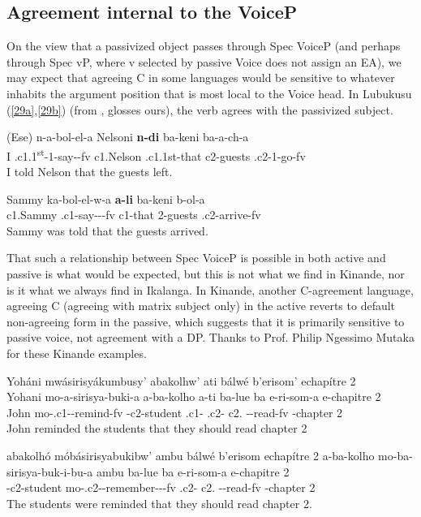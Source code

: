 \documentclass[output=paper,
modfonts
]{langscibook}
\begin{document}
\subsection{Agreement internal to the VoiceP}\label{s3.1}

On the view that a passivized object passes through Spec VoiceP (and perhaps through Spec vP, where v selected by passive Voice does not assign an EA), we may expect that agreeing C in some languages would be sensitive to whatever inhabits the argument position that is most local to the Voice head. In Lubukusu (\ref{29a},\ref{29b}) (from \citealt[368]{Diercks2013}, glosses ours), the verb agrees with the passivized subject.

\ea\label{29}
\ea \gll (Ese) n-a-bol-el-a Nelsoni \textbf{n-di} ba-keni ba-a-ch-a \label{29a}\\
          I .c1.1\textsuperscript{st}-1-say--fv c1.Nelson .c1.1st-that c2-guests
          .c2-1-go-fv\\
		\glt I told Nelson that the guests left.

\ex \gll Sammy ka-bol-el-w-a \textbf{a-li} ba-keni b-ol-a\label{29b}\\
		c1.Sammy .c1-say---fv c1-that 2-guests .c2-arrive-fv\\
	\glt  Sammy was told that the guests arrived. \z\z

That such a relationship between Spec VoiceP is possible in both active and passive is what would be expected, but this is not what we find in Kinande, nor is it what we always find in Ikalanga. In Kinande, another C-agreement language, agreeing C (agreeing with matrix subject only) in the active reverts to default non-agreeing form in the passive, which suggests that it is primarily sensitive to passive voice, not agreement with a DP. Thanks to Prof. Philip Ngessimo Mutaka for these Kinande examples.

\ea \label{30}
\ea	Yoháni mwásirisyákumbusy’ 	abakolhw’ 	ati bálwé b’erisom’  echapítre 2\\
	\gll Yohani mo-a-sirisya-buki-a  a-ba-kolho a-ti ba-lue ba
    e-ri-som-a {e-chapitre 2}\\
	John     mo-.c1--remind-fv -c2-student .c1-    .c2- c2. 		--read-fv {-chapter 2} \\
	\glt John reminded the students that they should read chapter 2

\ex abakolhó móbásirisyabukibw’ ambu bálwé b’erisom echapítre 2
	\gll a-ba-kolho mo-ba-sirisya-buk-i-bu-a ambu   ba-lue ba
    e-ri-som-a {e-chapitre 2}\\
	-c2-student mo-.c2--remember---fv  .c2- c2. 	 --read-fv  {-chapter 2}\\
    \glt The students were reminded that they should read chapter 2.
    \z \z
\end{document}
